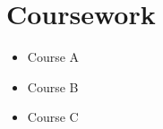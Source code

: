 \section[Coursework]{ Coursework}

\vspace{-1em}
\begin{multicols}{2}
\begin{itemize} \itemsep-0.4em
\item Course A
\item Course B
\item Course C
\end{itemize}
\end{multicols}
